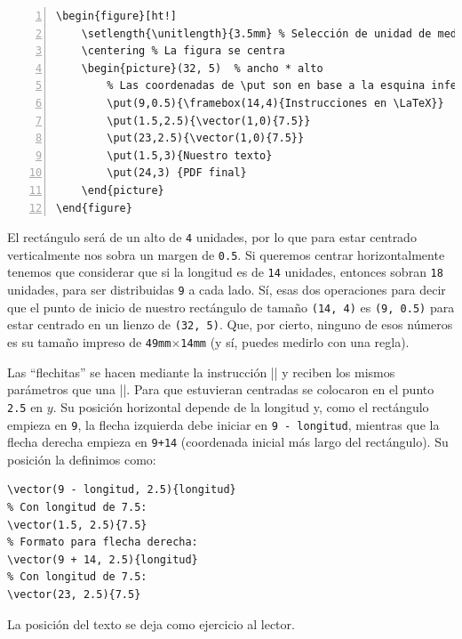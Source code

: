 \begin{lstlisting}[style=latex,numbers=left,label=lst:picture_esquema,caption={Código de la figura \ref{fig:esquema_latex}.}]
\begin{figure}[ht!]
	\setlength{\unitlength}{3.5mm} % Selección de unidad de medida.
	\centering % La figura se centra
	\begin{picture}(32, 5)  % ancho * alto
		% Las coordenadas de \put son en base a la esquina inferior izquierda
		\put(9,0.5){\framebox(14,4){Instrucciones en \LaTeX}}
		\put(1.5,2.5){\vector(1,0){7.5}}
		\put(23,2.5){\vector(1,0){7.5}}
		\put(1.5,3){Nuestro texto}
		\put(24,3) {PDF final}
	\end{picture}
\end{figure}
\end{lstlisting}

El rectángulo será de un alto de \texttt{4} unidades, por lo que para estar centrado verticalmente nos sobra un margen de \texttt{0.5}. Si queremos centrar horizontalmente tenemos que considerar que si la longitud es de \texttt{14} unidades, entonces sobran \texttt{18} unidades, para ser distribuidas \texttt{9} a cada lado. Sí, esas dos operaciones para decir que el punto de inicio de nuestro rectángulo de tamaño \texttt{(14, 4)} es \texttt{(9, 0.5)} para estar centrado en un lienzo de \texttt{(32, 5)}. Que, por cierto, ninguno de esos números es su tamaño impreso de \texttt{49mm$\times$14mm} (y sí, puedes medirlo con una regla).

Las ``flechitas'' se hacen mediante la instrucción |\vector| y reciben los mismos parámetros que una |\line|. Para que estuvieran centradas se colocaron en el punto \texttt{2.5} en $y$. Su posición horizontal depende de la longitud y, como el rectángulo empieza en \texttt{9}, la flecha izquierda debe iniciar en \texttt{9 - longitud}, mientras que la flecha derecha empieza en \texttt{9+14} (coordenada inicial más largo del rectángulo). Su posición la definimos como:

\begin{lstlisting}[style=latex]
% Formato para realizar los cálculos de la flecha izquierda.
\vector(9 - longitud, 2.5){longitud}
% Con longitud de 7.5:
\vector(1.5, 2.5){7.5}
% Formato para flecha derecha:
\vector(9 + 14, 2.5){longitud}
% Con longitud de 7.5:
\vector(23, 2.5){7.5}
\end{lstlisting}

La posición del texto se deja como ejercicio al lector.



